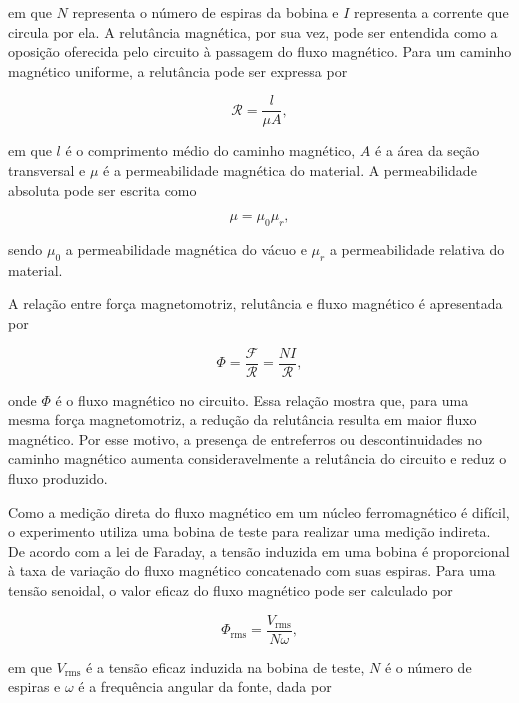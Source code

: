 \documentclass[11pt,a4paper]{article}
\begin{document}
em que \(N\) representa o número de espiras da bobina e \(I\) representa a corrente que circula por ela. A relutância magnética, por sua vez, pode ser entendida como a oposição oferecida pelo circuito à passagem do fluxo magnético. Para um caminho magnético uniforme, a relutância pode ser expressa por

\begin{equation} 
    \mathcal{R} = \frac{l}{\mu A}, 
    \label{eq:relutancia} 
\end{equation}

em que \(l\) é o comprimento médio do caminho magnético, \(A\) é a área da seção transversal e \(\mu\) é a permeabilidade magnética do material. A permeabilidade absoluta pode ser escrita como

\begin{equation} 
    \mu = \mu_0 \mu_r , 
    \label{eq:permeabilidade} 
\end{equation}

sendo \(\mu_0\) a permeabilidade magnética do vácuo e \(\mu_r\) a permeabilidade relativa do material.

A relação entre força magnetomotriz, relutância e fluxo magnético é apresentada por

\begin{equation} 
    \Phi = \frac{\mathcal{F}}{\mathcal{R}} = \frac{N I}{\mathcal{R}}, \label{eq:fluxo_relutancia} 
\end{equation}

onde \(\Phi\) é o fluxo magnético no circuito. Essa relação mostra que, para uma mesma força magnetomotriz, a redução da relutância resulta em maior fluxo magnético. Por esse motivo, a presença de entreferros ou descontinuidades no caminho magnético aumenta consideravelmente a relutância do circuito e reduz o fluxo produzido.

Como a medição direta do fluxo magnético em um núcleo ferromagnético é difícil, o experimento utiliza uma bobina de teste para realizar uma medição indireta. De acordo com a lei de Faraday, a tensão induzida em uma bobina é proporcional à taxa de variação do fluxo magnético concatenado com suas espiras. Para uma tensão senoidal, o valor eficaz do fluxo magnético pode ser calculado por

\begin{equation} 
    \Phi_{\text{rms}} = \frac{V_{\text{rms}}}{N \omega}, 
    \label{eq:fluxo_farad} 
\end{equation}

em que \(V_{\text{rms}}\) é a tensão eficaz induzida na bobina de teste, \(N\) é o número de espiras e \(\omega\) é a frequência angular da fonte, dada por
\end{document}

